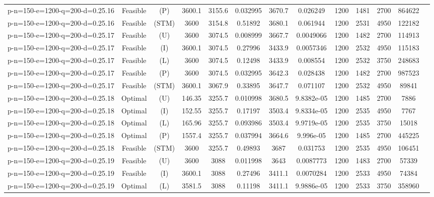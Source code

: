 \documentclass[landscape, a4paper]{article}
\newcommand{\STM}{\ensuremath{\mathrm{STM}}}
\newcommand{\Improved}{\ensuremath{\mathrm{I}}}
\newcommand{\Loose}{\ensuremath{\mathrm{L}}}
\newcommand{\Profit}{\ensuremath{\mathrm{P}}}
\newcommand{\Utility}{\ensuremath{\mathrm{U}}}
\begin{document}
\begin{center}
\begin{tabular}{lcccccccccccc}
p-n=150-e=1200-q=200-d=0.25.16 & Feasible & (\Profit) & 3600.1 & 3155.6 & 0.032995 & 3670.7 & 0.026249 & 1200 & 1481 & 2700 & 864622 & \\
p-n=150-e=1200-q=200-d=0.25.16 & Feasible & (\STM) & 3600 & 3154.8 & 0.51892 & 3680.1 & 0.061944 & 1200 & 2531 & 4950 & 122182 & \\
p-n=150-e=1200-q=200-d=0.25.17 & Feasible & (\Utility) & 3600 & 3074.5 & 0.008999 & 3667.7 & 0.0049066 & 1200 & 1482 & 2700 & 114913 & \\
p-n=150-e=1200-q=200-d=0.25.17 & Feasible & (\Improved) & 3600.1 & 3074.5 & 0.27996 & 3433.9 & 0.0057346 & 1200 & 2532 & 4950 & 115183 & \\
p-n=150-e=1200-q=200-d=0.25.17 & Feasible & (\Loose) & 3600 & 3074.5 & 0.12498 & 3433.9 & 0.008554 & 1200 & 2532 & 3750 & 248683 & \\
p-n=150-e=1200-q=200-d=0.25.17 & Feasible & (\Profit) & 3600 & 3074.5 & 0.032995 & 3642.3 & 0.028438 & 1200 & 1482 & 2700 & 987523 & \\
p-n=150-e=1200-q=200-d=0.25.17 & Feasible & (\STM) & 3600.1 & 3067.9 & 0.33895 & 3647.7 & 0.071107 & 1200 & 2532 & 4950 & 89841 & \\
p-n=150-e=1200-q=200-d=0.25.18 & Optimal & (\Utility) & 146.35 & 3255.7 & 0.010998 & 3680.5 & 9.8382e-05 & 1200 & 1485 & 2700 & 7886 & \\
p-n=150-e=1200-q=200-d=0.25.18 & Optimal & (\Improved) & 152.55 & 3255.7 & 0.17197 & 3503.4 & 9.8334e-05 & 1200 & 2535 & 4950 & 7767 & \\
p-n=150-e=1200-q=200-d=0.25.18 & Optimal & (\Loose) & 165.96 & 3255.7 & 0.093986 & 3503.4 & 9.9719e-05 & 1200 & 2535 & 3750 & 15018 & \\
p-n=150-e=1200-q=200-d=0.25.18 & Optimal & (\Profit) & 1557.4 & 3255.7 & 0.037994 & 3664.6 & 9.996e-05 & 1200 & 1485 & 2700 & 445225 & \\
p-n=150-e=1200-q=200-d=0.25.18 & Feasible & (\STM) & 3600 & 3255.7 & 0.49893 & 3687 & 0.031753 & 1200 & 2535 & 4950 & 106451 & \\
p-n=150-e=1200-q=200-d=0.25.19 & Feasible & (\Utility) & 3600 & 3088 & 0.011998 & 3643 & 0.0087773 & 1200 & 1483 & 2700 & 57339 & \\
p-n=150-e=1200-q=200-d=0.25.19 & Feasible & (\Improved) & 3600.1 & 3088 & 0.27496 & 3411.1 & 0.0070284 & 1200 & 2533 & 4950 & 74384 & \\
p-n=150-e=1200-q=200-d=0.25.19 & Optimal & (\Loose) & 3581.5 & 3088 & 0.11198 & 3411.1 & 9.9886e-05 & 1200 & 2533 & 3750 & 358960 & \\

\end{tabular}
\end{center}
\end{document}
